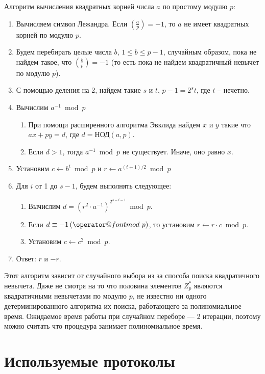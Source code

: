 \documentclass[12pt,a4paper]{report}
\makeatletter
\def\imod#1{\allowbreak\,({\operator@font mod}\ #1)}
\def \jacobi #1#2{\left(\frac{#1}{#2}\right)}
\makeatother
\begin{document}
Алгоритм вычисления квадратных корней числа $a$ по простому модулю $p$:

\begin{enumerate}
\item Вычисляем символ Лежандра. Если $\jacobi{a}{p} = -1$, то $a$ не имеет
квадратных корней по модулю $p$.
\item Будем перебирать целые числа $b$, $1 \leq b \leq p - 1$, случайным
образом, пока не найдем такое, что $\jacobi{b}{p} = -1$ (то есть пока не 
найдем квадратичный невычет по модулю $p$).
\item С помощью деления на 2, найдем такие $s$ и $t$, $p - 1 = 2^{s}t$, где
$t$ -- нечетно.
\item Вычислим $a^{-1}\bmod{p}$
\begin{enumerate}
\item При помощи расширенного алгоритма Эвклида найдем $x$ и $y$ такие что $ax + py = d$, где $d = \textrm{НОД}(a, p)$.
\item Если $d > 1$, тогда $a^{-1}\bmod{p}$ не существует. Иначе, оно равно $x$.
\end{enumerate}
\item Установим $c \leftarrow b^t \bmod{p}$ и $r \leftarrow a^{(t+1)/2} \bmod{p}$
\item Для $i$ от 1 до $s - 1$, будем выполнять следующее:
\begin{enumerate}
\item Вычислим $d = (r^2 \cdot a^{-1})^{2^{s - i -1}} \bmod{p}$.
\item Если $d \equiv -1 \imod{p}$, то установим $r \leftarrow r \cdot c \bmod{p}$.
\item Установим $c \leftarrow c^2 \bmod{p}$.
\end{enumerate}
\item Ответ: $r$ и $-r$.
\end{enumerate}

Этот алгоритм зависит от случайного выбора из за способа поиска квадратичного
невычета. Даже не смотря на то что половина элементов $Z^*_p$ являются
квадратичными невычетами по модулю $p$, не известно ни одного 
детерминированного алгоритма их поиска, работающего за полиномиальное время.
Ожидаемое время работы при случайном переборе --- 2 итерации, поэтому
можно считать что процедура занимает полиномиальное время.


\chapter{Используемые протоколы}
\end{document}
